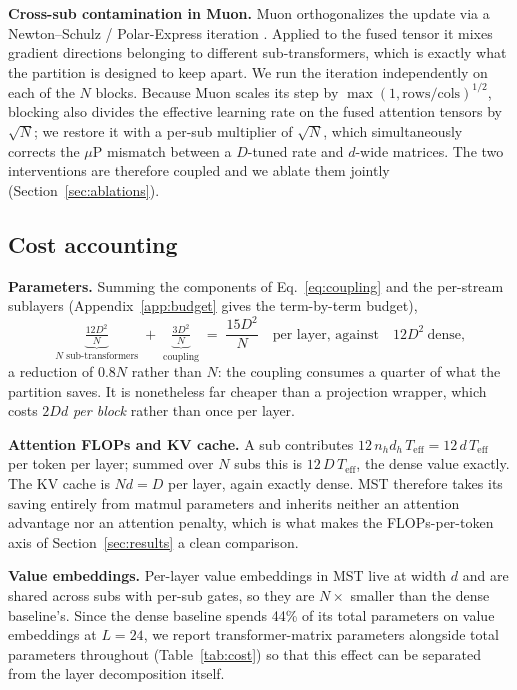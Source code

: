 \documentclass{article}
\newcommand{\dmodel}{D}
\newcommand{\dsub}{d}
\newcommand{\nsub}{N}
\begin{document}
\textbf{Cross-sub contamination in Muon.} Muon orthogonalizes the update via a
Newton--Schulz / Polar-Express iteration \citep{jordan2024muon, amsel2025polar}.
Applied to the fused tensor it mixes gradient directions belonging to different
sub-transformers, which is exactly what the partition is designed to keep apart.
We run the iteration independently on each of the $\nsub$ blocks. Because Muon
scales its step by $\max(1,\text{rows}/\text{cols})^{1/2}$, blocking also divides
the effective learning rate on the fused attention tensors by $\sqrt{\nsub}$; we
restore it with a per-sub multiplier of $\sqrt{\nsub}$, which simultaneously
corrects the $\mu$P \citep{yang2021mup} mismatch between a $\dmodel$-tuned rate
and $\dsub$-wide matrices. The two interventions are therefore coupled and we
ablate them jointly (Section~\ref{sec:ablations}).

\subsection{Cost accounting}
\label{sec:cost}



\textbf{Parameters.} Summing the components of Eq.~\ref{eq:coupling} and the
per-stream sublayers (Appendix~\ref{app:budget} gives the term-by-term budget),
%
\begin{equation}
\label{eq:budget}
\underbrace{\tfrac{12\dmodel^2}{\nsub}}_{\text{$\nsub$ sub-transformers}}
\;+\;
\underbrace{\tfrac{3\dmodel^2}{\nsub}}_{\text{coupling}}
\;=\;
\frac{15\dmodel^2}{\nsub}
\quad\text{per layer, against}\quad
12\dmodel^2\ \text{dense,}
\end{equation}
%
a reduction of $0.8\nsub$ rather than $\nsub$: the coupling consumes a quarter of
what the partition saves. It is nonetheless far cheaper than a projection
wrapper, which costs $2\dmodel\dsub$ \emph{per block} rather than once per layer.

\textbf{Attention FLOPs and KV cache.} A sub contributes
$12\,n_h d_h\,T_{\mathrm{eff}} = 12\,\dsub\,T_{\mathrm{eff}}$ per token per layer;
summed over $\nsub$ subs this is $12\,\dmodel\,T_{\mathrm{eff}}$, the dense value
exactly. The KV cache is $\nsub\dsub = \dmodel$ per layer, again exactly dense.
MST therefore takes its saving entirely from matmul parameters and inherits
neither an attention advantage nor an attention penalty, which is what makes the
FLOPs-per-token axis of Section~\ref{sec:results} a clean comparison.

\textbf{Value embeddings.} Per-layer value embeddings \citep{zhou2024resformer} in
MST live at width $\dsub$ and are shared across subs with per-sub gates, so they
are $\nsub\times$ smaller than the dense baseline's. Since the dense baseline
spends 44\% of its total parameters on value embeddings at $L{=}24$, we report
transformer-matrix parameters alongside total parameters throughout
(Table~\ref{tab:cost}) so that this effect can be separated from the layer
decomposition itself.
\end{document}
